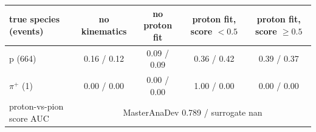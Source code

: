 \begin{tabular}{lcccc}
\toprule
true species (events) & no kinematics & no proton fit & proton fit, score $<0.5$ & proton fit, score $\geq 0.5$ \\
\midrule
p (664) & 0.16 / 0.12 & 0.09 / 0.09 & 0.36 / 0.42 & 0.39 / 0.37 \\
$\pi^+$ (1) & 0.00 / 0.00 & 0.00 / 0.00 & 1.00 / 0.00 & 0.00 / 0.00 \\
\midrule
proton-vs-pion score AUC & \multicolumn{4}{c}{MasterAnaDev 0.789 / surrogate nan} \\
\bottomrule
\end{tabular}
